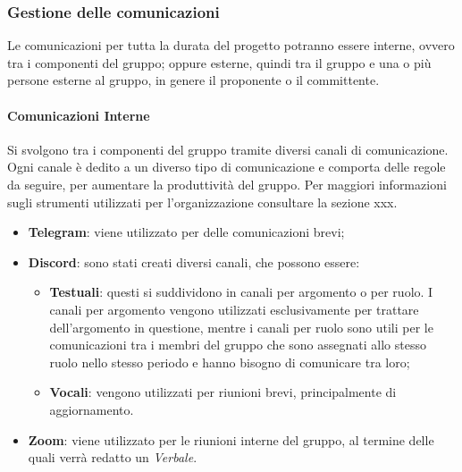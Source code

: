 \subsubsection{Gestione delle comunicazioni}
Le comunicazioni per tutta la durata del progetto potranno essere interne, ovvero tra i componenti del gruppo;
oppure esterne, quindi tra il gruppo e una o più persone esterne al gruppo, in genere il proponente o il committente.

\paragraph{Comunicazioni Interne}
Si svolgono tra i componenti del gruppo tramite diversi canali di comunicazione. 
Ogni canale è dedito a un diverso tipo di comunicazione e comporta delle regole da seguire, per aumentare la 
produttività del gruppo. Per maggiori informazioni sugli strumenti utilizzati per l'organizzazione consultare 
la sezione xxx.

\begin{itemize}
    \item \textbf{Telegram}: viene utilizzato per delle comunicazioni brevi;
    \item \textbf{Discord}: sono stati creati diversi canali, che possono essere:
    \begin{itemize}
        \item \textbf{Testuali}: questi si suddividono in canali per argomento o per ruolo. I canali per argomento vengono utilizzati 
        esclusivamente per trattare dell'argomento in questione, mentre i canali per ruolo sono utili per le comunicazioni tra i membri del gruppo che
        sono assegnati allo stesso ruolo nello stesso periodo e hanno bisogno di comunicare tra loro;
        \item \textbf{Vocali}: vengono utilizzati per riunioni brevi, principalmente di aggiornamento.
    \end{itemize}
    \item \textbf{Zoom}: viene utilizzato per le riunioni interne del gruppo, al termine delle quali verrà redatto un \textit{Verbale}.
\end{itemize}

